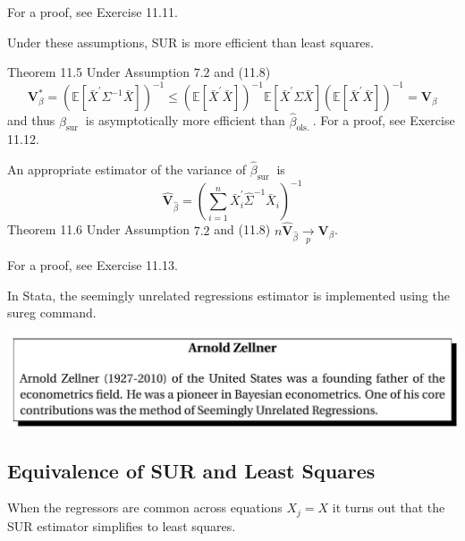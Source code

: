 \documentclass[10pt]{article}
\begin{document}
For a proof, see Exercise 11.11.

Under these assumptions, SUR is more efficient than least squares.

Theorem 11.5 Under Assumption $7.2$ and (11.8)
$$
\boldsymbol{V}_{\beta}^{*}=\left(\mathbb{E}\left[\bar{X}^{\prime} \Sigma^{-1} \bar{X}\right]\right)^{-1} \leq\left(\mathbb{E}\left[\bar{X}^{\prime} \bar{X}\right]\right)^{-1} \mathbb{E}\left[\bar{X}^{\prime} \Sigma \bar{X}\right]\left(\mathbb{E}\left[\bar{X}^{\prime} \bar{X}\right]\right)^{-1}=\boldsymbol{V}_{\beta}
$$
and thus $\widehat{\beta}_{\text {sur }}$ is asymptotically more efficient than $\widehat{\beta}_{\text {ols. }}$. For a proof, see Exercise 11.12.

An appropriate estimator of the variance of $\widehat{\beta}_{\text {sur }}$ is
$$
\widehat{\boldsymbol{V}}_{\widehat{\beta}}=\left(\sum_{i=1}^{n} \bar{X}_{i}^{\prime} \widehat{\Sigma}^{-1} \bar{X}_{i}\right)^{-1}
$$
Theorem 11.6 Under Assumption $7.2$ and (11.8) $n \widehat{\boldsymbol{V}}_{\widehat{\beta}} \underset{p}{\longrightarrow} \boldsymbol{V}_{\beta}$.

For a proof, see Exercise 11.13.

In Stata, the seemingly unrelated regressions estimator is implemented using the sureg command.

\includegraphics[max width=\textwidth]{2022_09_17_2536389c9af66f64c886g-09}

\subsection{Equivalence of SUR and Least Squares}
When the regressors are common across equations $X_{j}=X$ it turns out that the SUR estimator simplifies to least squares.
\end{document}
